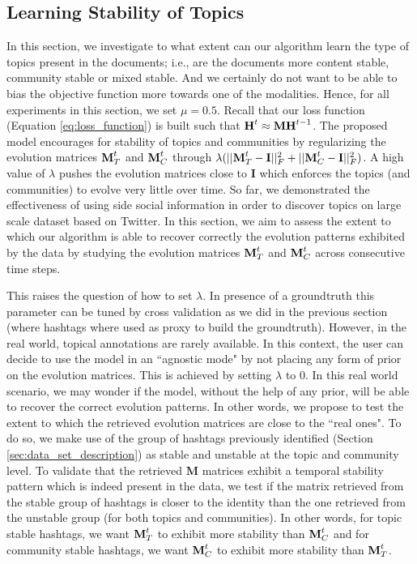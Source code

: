 \subsection{Learning Stability of Topics}
\label{subsec:learning_stability}
In this section, we investigate to what extent can our algorithm learn the type of
topics present in the documents; i.e., are the documents more content stable,
community stable or mixed stable. And we certainly do not want to be able to bias the
objective function more towards one of the modalities.  Hence, for all experiments
in this section, we set $\mu = 0.5$.
Recall that our loss function (Equation \ref{eq:loss_function}) is built such
that $\textbf{H}^t \approx \mathbf{M} \textbf{H}^{t-1}$. 
The proposed model encourages for stability of topics and communities by regularizing the evolution matrices 
$\textbf{M}^t_T$ and $\textbf{M}^t_C$
through $\lambda(||\textbf{M}^t_T - \textbf{I}||_F^{2} + ||\textbf{M}^t_C - \textbf{I}||_F^2)$. 
A high value of $\lambda$ pushes the evolution matrices close to $\mathbf{I}$ 
which enforces the topics (and communities) to evolve very little over time.  
So far, we demonstrated the effectiveness of using side social information in 
order to discover topics on large scale dataset based on Twitter.
In this section, we aim to assess the extent to which our 
algorithm is able to recover correctly the evolution patterns exhibited by 
the data by studying the evolution matrices $\textbf{M}^t_T$ and $\textbf{M}^t_C$ across consecutive time steps.

This raises the question of how to set $\lambda$. In presence of a groundtruth this parameter 
can be tuned by cross validation as we did in the previous section (where hashtags where used as proxy 
to build the groundtruth). However, in the real world, topical annotations are rarely available. 
In this context, the user can decide to use the model in an ``agnostic mode" by not placing 
any form of prior on the evolution matrices. 
This is achieved by setting $\lambda$ to 0.  In this real world scenario, we may wonder if the model, 
without the help of any prior, will be able to recover the correct evolution patterns. In other words, we 
propose to test the extent to which the retrieved evolution matrices are close to the ``real ones". To do so, 
we make use of the group of hashtags previously identified (Section \ref{sec:data_set_description}) as 
stable and unstable at the topic and community level. To validate that the retrieved $\mathbf{M}$ 
matrices exhibit a temporal stability pattern which is indeed present in the data, we test if the matrix retrieved 
from the stable group of hashtags is closer to the identity than the one retrieved from 
the unstable group (for both topics and communities).  In other words, for topic stable hashtags,
we want $\textbf{M}^t_T$ to exhibit more stability than $\textbf{M}^t_C$ and for community stable hashtags,
we want $\textbf{M}^t_C$ to exhibit more stability than $\textbf{M}^t_T$.
 
